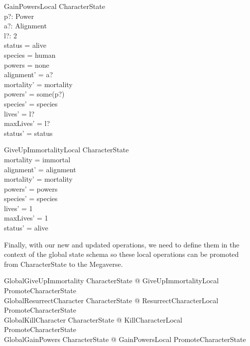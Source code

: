 \documentclass{article}
\begin{document}
\begin{schema}{GainPowersLocal}
\Delta CharacterState \\
p?: Power \\
a?: Alignment \\
l?: 2  \\
\where
status = alive \\ 
species = human \\
powers = none \\
alignment' = a? \\
mortality' = mortality \\
powers' = some(p?) \\ 
species' = species \\
lives' = l? \\
maxLives' = l? \\
status' = status \\
\end{schema}

\begin{schema}{GiveUpImmortalityLocal}
\Delta CharacterState \\
\where
mortality = immortal \\
alignment' = alignment \\
mortality' = mortality \\
powers' = powers \\ 
species' = species \\
lives' = 1 \\
maxLives' = 1 \\
status' = alive \\
\end{schema}

\hspace{-0.7cm} Finally, with our new and updated operations, we need to define them in the context of the global state schema so these local operations can be promoted from CharacterState to the Megaverse.

\begin{zed}
GlobalGiveUpImmortality  \exists \Delta CharacterState @ GiveUpImmortalityLocal \land PromoteCharacterState \\
GlobalResurrectCharacter  \exists \Delta CharacterState @ ResurrectCharacterLocal \land PromoteCharacterState \\
GlobalKillCharacter  \exists \Delta CharacterState @ KillCharacterLocal \land PromoteCharacterState \\ 
GlobalGainPowers  \exists \Delta CharacterState @ GainPowersLocal \land PromoteCharacterState \\
\end{zed}
\end{document}
